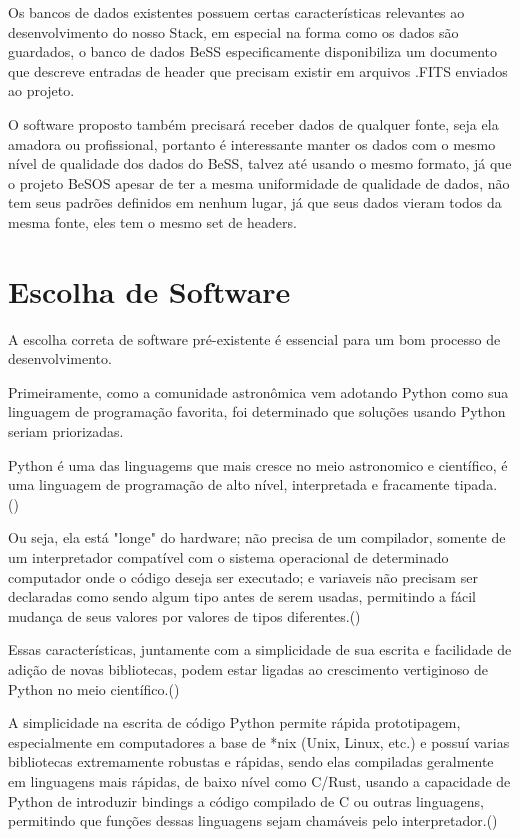 Os bancos de dados existentes possuem certas características relevantes ao desenvolvimento do nosso Stack, em especial na forma como os dados são guardados, o banco de dados BeSS especificamente disponibiliza um documento que descreve entradas de header que precisam existir em arquivos .FITS enviados ao projeto.

O software proposto também precisará receber dados de qualquer fonte, seja ela amadora ou profissional, portanto é interessante manter os dados com o mesmo nível de qualidade dos dados do BeSS, talvez até usando o mesmo formato, já que o projeto BeSOS apesar de ter a mesma uniformidade de qualidade de dados, não tem seus padrões definidos em nenhum lugar, já que seus dados vieram todos da mesma fonte, eles tem o mesmo set de headers.

\section{Escolha de Software}

A escolha correta de software pré-existente é essencial para um bom processo de desenvolvimento.

Primeiramente, como a comunidade astronômica vem adotando Python como sua linguagem de programação favorita, foi determinado que soluções usando Python seriam priorizadas.

Python é uma das linguagems que mais cresce no meio astronomico e científico, é uma linguagem de programação de alto nível, interpretada e fracamente tipada. (\citealt{software_use_in_astronomy})

Ou seja, ela está "longe" do hardware; não precisa de um compilador, somente de um interpretador compatível com o sistema operacional de determinado computador onde o código deseja ser executado; e variaveis não precisam ser declaradas como sendo algum tipo antes de serem usadas, permitindo a fácil mudança de seus valores por valores de tipos diferentes.(\citealt{python3_manual})

Essas características, juntamente com a simplicidade de sua escrita e facilidade de adição de novas bibliotecas, podem estar ligadas ao crescimento vertiginoso de Python no meio científico.(\citealt{software_use_in_astronomy})

A simplicidade na escrita de código Python permite rápida prototipagem, especialmente em computadores a base de *nix (Unix, Linux, etc.) e possuí varias bibliotecas extremamente robustas e rápidas, sendo elas compiladas geralmente em linguagens mais rápidas, de baixo nível como C/Rust, usando a capacidade de Python de introduzir bindings a código compilado de C ou outras linguagens, permitindo que funções dessas linguagens sejam chamáveis pelo interpretador.(\citealt{python3_manual})


